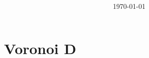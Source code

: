 \documentclass[a4paper,11pt]{article}
\title{ }
\author{ }
\date{\today}
\begin{document}
 \maketitle

\section{Voronoi D}

\begin{figure}[ht] \centering
	
\end{figure}

%
\end{document}
